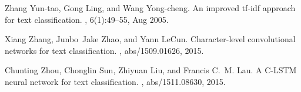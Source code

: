 \documentclass{article}
\begin{document}
\begin{thebibliography}{10}
Zhang Yun-tao, Gong Ling, and Wang Yong-cheng.
\newblock An improved tf-idf approach for text classification.
, 6(1):49--55, Aug
  2005.

Xiang Zhang, Junbo~Jake Zhao, and Yann LeCun.
\newblock Character-level convolutional networks for text classification.
, abs/1509.01626, 2015.

Chunting Zhou, Chonglin Sun, Zhiyuan Liu, and Francis C.~M. Lau.
\newblock A {C-LSTM} neural network for text classification.
, abs/1511.08630, 2015.

\end{thebibliography}
\end{document}
